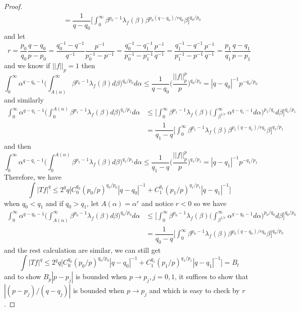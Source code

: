 \documentclass[lang=en, color=blue, ]{elegantbook}
\newcommand{\dstrb}[1]{\lambda_{#1}}
\begin{document}
\begin{proof}
\[\begin{aligned}
    & = \dfrac{1}{q-q_0}\Big[\int_0^{\infty}\beta^{p_0-1}\dstrb{f}(\beta)\beta^{p_0(q-q_0)/rq_0}\beta\Big]^{q_0/p_0}
    \end{aligned}
    \]
    and let \[r = \dfrac{p_0}{q_0}\dfrac{q-q_0}{p-p_0} = \dfrac{q_0^{-1}-q^{-1}}{q^{-1}}\dfrac{p^{-1}}{p_0^{-1}-p^{-1}} = \dfrac{q_0^{-1}-q_1^{-1}}{p_0^{-1}-p_1^{-1}}\dfrac{p^{-1}}{q^{-1}} = \dfrac{q_1^{-1}-{q^{-1}}}{p_1^{-1}-p^{-1}}\dfrac{p^{-1}}{q^{-1}} = \dfrac{p_1}{q_1}\dfrac{q-q_1}{p-p_1}\]
    and we know if $||f||_p = 1$ then
    \[
    \int_0^{\infty}\alpha^{q-q_0-1}\Big(\int_{A(\alpha)}^{\infty}\beta^{p_0-1}\dstrb{f}(\beta)d\beta\Big)^{q_0/p_0}d\alpha \leq  \dfrac{1}{q-q_0}\Big(\dfrac{||f||_p^p}{p}\Big)^{q_0/p_0} = |q-q_0|^{-1}p^{-q_0/p_0}
    \]
    and similarly
    \[
    \begin{aligned}
    \int_0^{\infty}\alpha^{q-q_1-1}\Big(\int_0^{A(\alpha)}\beta^{p_1-1}\dstrb{f}(\beta)d\beta\Big)^{q_1/p_1}d\alpha &\leq \Big[\int_0^{\infty}\beta^{p_1-1}\dstrb{f}(\beta)\Big(\int_{\beta^{1/r}}^{\infty} \alpha^{q-q_1-1}d\alpha\Big)^{p_1/q_1}d\beta\Big]^{q_1/p_1} \\
    & = \dfrac{1}{q_1-q}\Big[\int_0^{\infty}\beta^{p_1-1}\dstrb{f}(\beta)\beta^{p_1(q-q_1)/rq_1}\beta\Big]^{q_1/p_1}
    \end{aligned}
    \]
    and then
    \[
    \int_0^{\infty}\alpha^{q-q_1-1}\Big(\int_0^{A(\alpha)}\beta^{p_1-1}\dstrb{f}(\beta)d\beta\Big)^{q_1/p_1}d\alpha \leq  \dfrac{1}{q_1-q}\Big(\dfrac{||f||_p^p}{p}\Big)^{q_1/p_1} = |q-q_1|^{-1}p^{-q_1/p_1}
    \]
    Therefore, we have
    \[
    \int |Tf|^q \leq 2^qq\Big[C_0^{q_0}(p_0/p)^{q_0/p_0}|q-q_0|^{-1}+C_1^{q_1}(p_1/p)^{q_1/p_1}|q-q_1|^{-1} \Big]
    \]
    when $q_0 < q_1$ and if $q_0 > q_1$, let $A(\alpha) = \alpha^{r}$ and notice $r<0$ so we have
    \[
    \begin{aligned}
    \int_0^{\infty}\alpha^{q-q_0-1}\Big(\int_{A(\alpha)}^{\infty}\beta^{p_0-1}\dstrb{f}(\beta)d\beta\Big)^{q_0/p_0}d\alpha &\leq \Big[\int_0^{\infty}\beta^{p_0-1}\dstrb{f}(\beta)\Big(\int_{\beta^{1/r}}^{\infty} \alpha^{q-q_0-1}d\alpha\Big)^{p_0/q_0}d\beta\Big]^{q_0/p_0} \\
    & = \dfrac{1}{q_0-q}\Big[\int_0^{\infty}\beta^{p_0-1}\dstrb{f}(\beta)\beta^{p_0(q-q_0)/rq_0}\beta\Big]^{q_0/p_0}
    \end{aligned}
    \]
    and the rest calculation are similar, we can still get
    \[
    \int |Tf|^q \leq 2^qq\Big[C_0^{q_0}(p_0/p)^{q_0/p_0}|q-q_0|^{-1}+C_1^{q_1}(p_1/p)^{q_1/p_1}|q-q_1|^{-1} \Big] = B_t
    \]
    and to show $B_p|p-p_j|$ is bounded when $p\to p_j, j = 0,1$, it suffices to show that $|(p-p_j)/(q-q_j)|$ is bounded when $p\to p_j$ and which is easy to check by $r$.\par

\end{proof}
\end{document}
